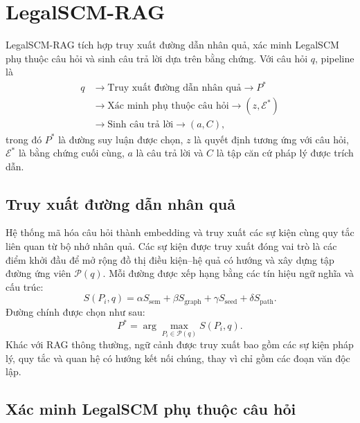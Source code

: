 \section{LegalSCM-RAG}
\label{sec:legalscm_rag}

LegalSCM-RAG tích hợp truy xuất đường dẫn nhân quả, xác minh LegalSCM phụ thuộc
câu hỏi và sinh câu trả lời dựa trên bằng chứng. Với câu hỏi $q$, pipeline là
\begin{equation}
\begin{aligned}
q
&\rightarrow
\text{Truy xuất đường dẫn nhân quả}
\rightarrow P^*\\
&\rightarrow
\text{Xác minh phụ thuộc câu hỏi}
\rightarrow (z,\mathcal{E}^*)\\
&\rightarrow
\text{Sinh câu trả lời}
\rightarrow (a,C),
\end{aligned}
\label{eq:overall_pipeline}
\end{equation}
trong đó $P^*$ là đường suy luận được chọn, $z$ là quyết định tương ứng với câu
hỏi, $\mathcal{E}^*$ là bằng chứng cuối cùng, $a$ là câu trả lời và $C$ là tập
căn cứ pháp lý được trích dẫn.

\subsection{Truy xuất đường dẫn nhân quả}

Hệ thống mã hóa câu hỏi thành embedding và truy xuất các sự kiện cùng quy tắc
liên quan từ bộ nhớ nhân quả. Các sự kiện được truy xuất đóng vai trò là các
điểm khởi đầu để mở rộng đồ thị điều kiện--hệ quả có hướng và xây dựng tập
đường ứng viên $\mathcal{P}(q)$. Mỗi đường được xếp hạng bằng các tín hiệu ngữ
nghĩa và cấu trúc:
\begin{equation}
S(P_i,q)=
\alpha S_{\mathrm{sem}}
+\beta S_{\mathrm{graph}}
+\gamma S_{\mathrm{seed}}
+\delta S_{\mathrm{path}}.
\end{equation}
Đường chính được chọn như sau:
\begin{equation}
P^*=\arg\max_{P_i\in\mathcal{P}(q)}S(P_i,q).
\end{equation}
Khác với RAG thông thường, ngữ cảnh được truy xuất bao gồm các sự kiện pháp lý,
quy tắc và quan hệ có hướng kết nối chúng, thay vì chỉ gồm các đoạn văn độc lập.

\subsection{Xác minh LegalSCM phụ thuộc câu hỏi}

